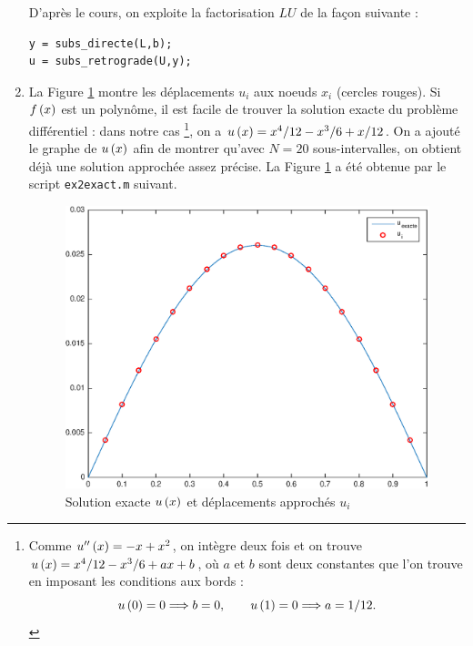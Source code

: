\begin{enumerate}[label=\alph*)]
        D'après le cours, on exploite la factorisation $LU$ de la façon suivante :
        
\begin{verbatim}
y = subs_directe(L,b);
u = subs_retrograde(U,y);
\end{verbatim}
        
  \item La Figure \ref{fig:solExacte} montre les déplacements $u_{i}$ aux noeuds $x_{i}$ (cercles rouges).
        Si $f \left(x\right)$ est un polynôme, il est facile de trouver la solution exacte du problème différentiel : dans notre cas \footnote{Comme $u'' \left(x\right) = - x + x^{2}$,
        on intègre deux fois et on trouve $u \left(x\right) = x^{4} / 12 - x^{3} / 6 + a x + b$, où $a$ et $b$ sont deux constantes que l'on trouve en imposant les conditions aux bords :
          \begin{equation*}
            u \left(0\right) = 0 \Longrightarrow b = 0, 
            \quad \quad
            u \left(1\right) = 0 \Longrightarrow a = 1/12.
          \end{equation*}},
        on a $u \left(x\right) = x^{4} / 12 - x^{3} / 6 + x / 12$.
        On a ajouté le graphe de $u \left(x\right)$ afin de montrer qu'avec $N = 20$ sous-intervalles, on obtient déjà une solution approchée assez précise.
        La Figure \ref{fig:solExacte} a été obtenue par le script \texttt{ex2exact.m} suivant.
        
        
        
        
\begin{figure}[h!]
  \centering
  \includegraphics[scale = 0.5]{s3/matlab/ex2_uexact.eps}
  \caption{Solution exacte $u \left(x\right)$ et déplacements approchés $u_{i}$}
  \label{fig:solExacte}
\end{figure}


\end{enumerate}
